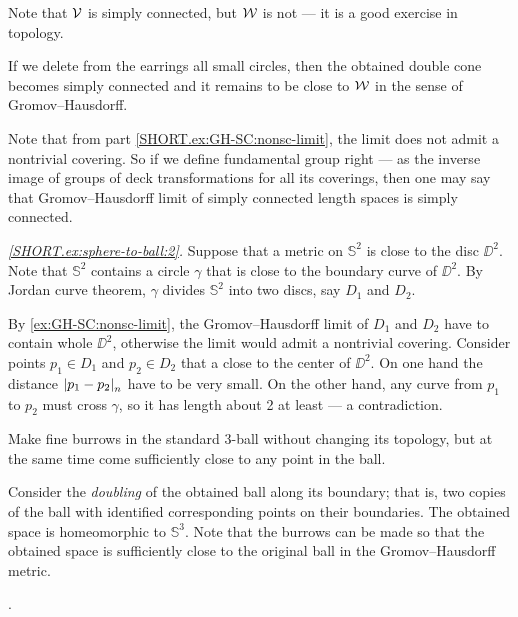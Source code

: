 Note that $\mathcal{V}$ is simply connected, but $\mathcal{W}$ is not --- it is a good exercise in topology.

If we delete from the earrings all small circles, then the obtained double cone becomes simply connected and it remains to be close to $\mathcal{W}$ in the sense of Gromov--Hausdorff.

Note that from part \ref{SHORT.ex:GH-SC:nonsc-limit}, the limit does not admit a nontrivial covering.
So if we define fundamental group right --- as the inverse image of groups of deck transformations for all its coverings, then one may say that Gromov--Hausdorff limit of simply connected length spaces is simply connected.

\parbf{\ref{ex:sphere-to-ball},}
\textit{\ref{SHORT.ex:sphere-to-ball:2}.}
Suppose that a metric on $\mathbb{S}^2$ is close to the disc $\DD^2$.
Note that $\mathbb{S}^2$ contains a circle $\gamma$ that is close to the boundary curve of $\DD^2$.
By Jordan curve theorem, $\gamma$ divides $\mathbb{S}^2$ into two discs, say $D_1$ and $D_2$.

By \ref{ex:GH-SC:nonsc-limit}, the Gromov--Hausdorff limit of $D_1$ and $D_2$ have to contain whole $\DD^2$, otherwise the limit would admit a nontrivial covering.
Consider points $p_1\in D_1$ and $p_2\in D_2$ that a close to the center of $\DD^2$.
On one hand the distance $\dist{p_1}{p_2}{n}$ have to be very small.
On the other hand, any curve from $p_1$ to $p_2$ must cross $\gamma$, so it has length about 2 at least --- a contradiction.



Make fine burrows in the standard 3-ball without changing its topology,
but at the same time come sufficiently close to any point in the ball.

Consider the \emph{doubling} of the obtained ball along its boundary;
that is, two copies of the ball with identified corresponding points on their boundaries.
The obtained space is homeomorphic to $\mathbb{S}^3$.
Note that the burrows can be made 
so that the obtained space is sufficiently close to the original ball 
in the Gromov--Hausdorff metric.

 \cite[Exercises 7.5.13 and 7.5.17]{burago-burago-ivanov}. 

